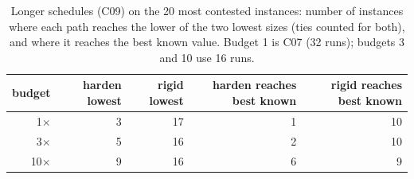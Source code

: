 \begin{table}[t]\centering\small
\begin{tabular}{rrrrr}
\toprule
budget & harden lowest & rigid lowest & harden reaches best known & rigid reaches best known\\
\midrule
1$\times$ & 3 & 17 & 1 & 10\\
3$\times$ & 5 & 16 & 2 & 10\\
10$\times$ & 9 & 16 & 6 & 9\\
\bottomrule
\end{tabular}
\caption{Longer schedules (C09) on the 20 most contested instances: number of instances where each path reaches the lower of the two lowest sizes (ties counted for both), and where it reaches the best known value. Budget 1 is C07 (32 runs); budgets 3 and 10 use 16 runs.}
\label{tab:budget}
\end{table}
